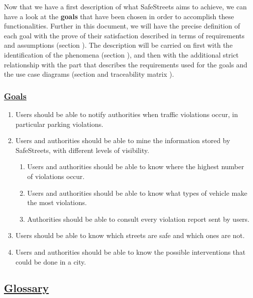 	 Now that we have a first description of what SafeStreets aims to achieve, we can have a look at the \textbf{goals} that have been chosen in order to accomplish these functionalities. Further in this document, we will have the precise definition of each goal with the prove of their satisfaction described in terms of requirements and assumptions (section ). The description will be carried on first with the identification of the phenomena (section ), and then with the additional strict relationship with the part that describes the requirements used for the goals and the use case diagrams (section  and traceability matrix ). 
	
	\subsubsection[Goals]{\hyperlink{toc}{Goals}}
		\label{sec:goals}
		\begin{enumerate}[label=\textbf{G\arabic*}]
			\item \label{goal:notification} Users should be able to notify authorities when traffic violations occur, in particular parking violations.
			\item \label{goal:mining} Users and authorities should be able to mine the information stored by SafeStreets, with different levels of visibility.
				\begin{enumerate}[label=\textbf{G2\Alph*}]
					\item \label{goal:miningA} Users and authorities should be able to know where the highest number of violations occur.
					\item \label{goal:miningB} Users and authorities should be able to know what types of vehicle make the most violations.
					\item \label{goal:miningC} Authorities should be able to consult every violation report sent by users.
				\end{enumerate}
			\item \label{goal:safety} Users should be able to know which streets are safe and which ones are not.
			\item \label{goal:intervention} Users and authorities should be able to know the possible interventions that could be done in a city.
		\end{enumerate}
	
\subsection[Glossary]{\hyperlink{toc}{Glossary}}
	\label{sec:glossary}
	
